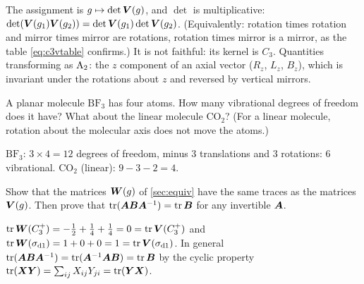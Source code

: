 \begin{solution}
The assignment is $g\mapsto\det\bm{V}(g)$, and $\det$ is multiplicative:
$\det(\bm{V}(g_1)\bm{V}(g_2))=\det\bm{V}(g_1)\det\bm{V}(g_2)$. (Equivalently: rotation
times rotation and mirror times mirror are rotations, rotation times mirror is a mirror,
as the table \eqref{eq:c3vtable} confirms.) It is not faithful: its kernel is $C_3$.
Quantities transforming as $\mathrm{A}_2$: the $z$ component of an axial vector ($R_z$,
$L_z$, $B_z$), which is invariant under the rotations about $z$ and reversed by vertical
mirrors.
\end{solution}

\begin{exercise}\label{ex:1:count}
A planar molecule $\mathrm{BF_3}$ has four atoms. How many vibrational degrees of
freedom does it have? What about the linear molecule $\mathrm{CO_2}$? (For a linear
molecule, rotation about the molecular axis does not move the atoms.)
\end{exercise}

\begin{solution}
$\mathrm{BF_3}$: $3\times4=12$ degrees of freedom, minus 3 translations and 3 rotations:
$6$ vibrational. $\mathrm{CO_2}$ (linear): $9-3-2=4$.
\end{solution}

\begin{exercise}\label{ex:1:equiv}
Show that the matrices $\bm{W}(g)$ of \cref{sec:equiv} have the same traces as the
matrices $\bm{V}(g)$. Then prove that $\operatorname{tr}(\bm{A}\bm{B}\bm{A}^{-1})=\operatorname{tr}\bm{B}$
for any invertible $\bm{A}$.
\end{exercise}

\begin{solution}
$\operatorname{tr}\bm{W}(C_3^+)=-\tfrac12+\tfrac14+\tfrac14=0=\operatorname{tr}\bm{V}(C_3^+)$ and
$\operatorname{tr}\bm{W}(\sigma_{\mathrm{d}1})=1+0+0=1=\operatorname{tr}\bm{V}(\sigma_{\mathrm{d}1})$. In general
$\operatorname{tr}(\bm{A}\bm{B}\bm{A}^{-1})=\operatorname{tr}(\bm{A}^{-1}\bm{A}\bm{B})=\operatorname{tr}\bm{B}$ by the cyclic
property $\operatorname{tr}(\bm{X}\bm{Y})=\sum_{ij}X_{ij}Y_{ji}=\operatorname{tr}(\bm{Y}\bm{X})$.
\end{solution}
